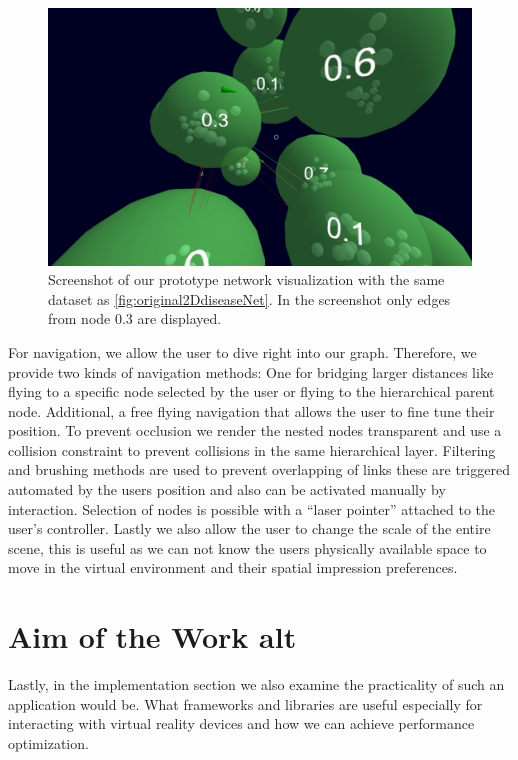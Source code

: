 \begin{figure}[h]
    \centering
    \includegraphics[width=1\textwidth]{graphics/conceptScreenshot.jpg}
    \caption{Screenshot of our prototype network visualization with the same dataset as \ref{fig:original2DdiseaseNet}. In the screenshot only edges from node 0.3 are displayed.} %
    \label{fig:conceptSketch} 
\end{figure}

For navigation, we allow the user to dive right into our graph. Therefore, we provide two kinds of navigation methods: One for bridging larger distances like flying to a specific node selected by the user or flying to the hierarchical parent node. Additional, a free flying navigation that allows the user to fine tune their position. To prevent occlusion we render the nested nodes transparent and use a collision constraint to prevent collisions in the same hierarchical layer. Filtering and brushing methods are used to prevent overlapping of links these are triggered automated by the users position and also can be activated manually by interaction. Selection of nodes is possible with a “laser pointer” attached to the user's controller. Lastly we also allow the user to change the scale of the entire scene, this is useful as we can not know the users physically available space to move in the virtual environment and their spatial impression preferences. 


\section{Aim of the Work alt}



Lastly, in the implementation section we also examine the practicality of such an application would be. What frameworks and libraries are useful especially for interacting with virtual reality devices and how we can achieve performance optimization. 
